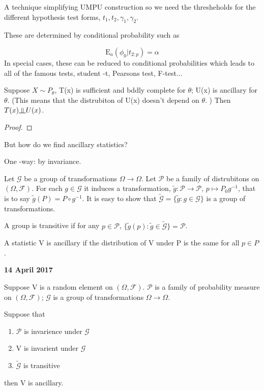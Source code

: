 \documentclass[11pt,fleqn]{book} %
\newcommand{\indep}{\rotatebox[origin=c]{90}{$\models$}}
\newcommand{\E}{\mathrm{E}}
\begin{document}
A technique simplifying UMPU construction so we need the thresheholds for the different hypothesis test forms, $t_1, t_2, \gamma_1, \gamma_2$. 

These are determined by conditional probability such as 

		$$\E_a (\phi_0|t_{2:p}) = \alpha $$
In special cases, these can be reduced to conditional probabilities which leads to all of the famous tests, student -t, Pearsons test, F-test...

\begin{theorem}
	Suppose $X \sim P_\theta$, T(x) is sufficient and bddly complete for $\theta$; U(x) is ancillary for $\theta$. (This means that the distrubiton of U(x) doesn't depend on $\theta$. ) Then $T(x) \indep U(x)$.
\end{theorem}

\begin{proof}
	
\end{proof}


But how do we find ancillary statistics?

One -way: by invariance. 

Let $\mathcal{G}$ be a group of transformations $\Omega \rightarrow \Omega$. Let $\mathcal{P}$ be a family of distrubitons on $(\Omega, \mathcal{F})$. For each $g \in \mathcal{G}$
it induces a transformation, $\tilde{g}: \mathcal{P} \rightarrow \mathcal{P}$, $p \mapsto P_0 g^{-1}$, that is to say $\tilde{g}(P) = P \circ g^{-1}$. It is easy to show that $\tilde{\mathcal{G}} = \{\tilde{g} : g \in \mathcal{G} \}$ is a group of transformations. 

A group is transitive if for any $p \in \mathcal{P}$, $\{\tilde{g}(p):\tilde{g} \in \tilde{\mathcal{G}} \} = \mathcal{P}$. 

A statistic V is ancillary if the distribution of V under P is the same for all $p \in P$. 


\textbf{14 April 2017}\\

\begin{theorem}
	Suppose V is a random element on $(\Omega, \mathcal{F})$. $\mathcal{P}$ is a family of probability measure on $(\Omega, \mathcal{F})$; $\mathcal{G}$ is a group of transformations $\Omega \rightarrow \Omega$. 

	Suppose that 

			\begin{enumerate}
				\item $\mathcal{P}$ is invarience under $\mathcal{G}$
				\item V is invarient under $\mathcal{G}$
				\item $\tilde{\mathcal{G}}$ is transitive 
			\end{enumerate}

	then V is ancillary. 
\end{theorem}
\end{document}
